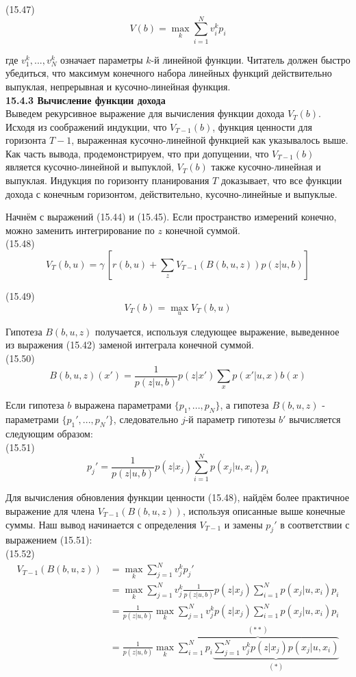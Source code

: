 \documentclass[10pt,a4paper]{article}
\begin{document}
(15.47)
$$V(b)=\underset{k}{\max}\sum_{i=1}^N v_i^k p_i$$

где $v_1^k,..., v_N^k$ означает параметры $k$-й линейной функции. Читатель должен быстро убедиться, что максимум конечного набора линейных функций действительно выпуклая, непрерывная и кусочно-линейная функция.\\

\textbf{15.4.3	Вычисление функции дохода}\\

Выведем рекурсивное выражение для вычисления функции дохода $V_T (b)$. Исходя из соображений индукции, что $V_{T-1}(b)$, функция ценности для горизонта $T-1$, выраженная кусочно-линейной функцией как указывалось выше. Как часть вывода, продемонстрируем, что при допущении, что $V_{T-1}(b)$ является кусочно-линейной и выпуклой, $V_T (b)$ также кусочно-линейная и выпуклая. Индукция по горизонту планирования $T$ доказывает, что все функции дохода с конечным горизонтом, действительно, кусочно-линейные и выпуклые.

Начнём с выражений (15.44) и (15.45). Если пространство измерений конечно, можно заменить интегрирование по $z$ конечной суммой.\\

(15.48)
$$V_T(b,u)=\gamma\,\left[ r(b,u)+\sum_z V_{T-1}(B(b,u,z))p(z|u,b)\right] $$

(15.49)
$$V_T(b)=\underset{u}{\max}V_T(b,u)$$

Гипотеза $B(b, u, z)$ получается, используя следующее выражение, выведенное из выражения (15.42) заменой интеграла конечной суммой.\\

(15.50)
$$B(b,u,z)(x')=\frac{1}{p(z|u,b)}p(z|x')\sum_xp(x'|u,x)b(x)$$

Если гипотеза $b$ выражена параметрами $\{p_1,..., p_N \}$, а гипотеза
$B(b, u, z)$ - параметрами $\{p_1',..., p_N'\}$, следовательно $j$-й параметр гипотезы $b'$ вычисляется следующим образом:\\

(15.51)
$$p_j'=\frac{1}{p(z|u,b)}p(z|x_j)\sum_{i=1}^Np(x_j|u,x_i)p_i$$

Для вычисления обновления функции ценности (15.48), найдём более практичное выражение для члена $V_{T-1}(B(b, u, z))$, используя описанные выше конечные суммы. Наш вывод начинается с определения $V_{T-1}$ и замены $p_j'$ в соответствии с выражением (15.51):\\

(15.52)
\begin{equation*}
\begin{split}
V_{T-1}(B(b,u,z))&=\underset{k}{\max}\sum_{j=1}^N v_j^k p_j'\\
&=\underset{k}{\max}\sum_{j=1}^N v_j^k \frac{1}{p(z|u,b)}p(z|x_j)\sum_{i=1}^Np(x_j|u,x_i)p_i\\
&=\frac{1}{p(z|u,b)}\underset{k}{\max}\sum_{j=1}^N v_j^kp(z|x_j)\sum_{i=1}^Np(x_j|u,x_i)p_i\\
&=\frac{1}{p(z|u,b)}\underset{k}{\max}\overbrace{\sum_{i=1}^Np_i\underbrace{\sum_{j=1}^N v_j^kp(z|x_j)p(x_j|u,x_i)}_{(\ast)}}^{(\ast\ast)}
\end{split}
\end{equation*}
\end{document}
